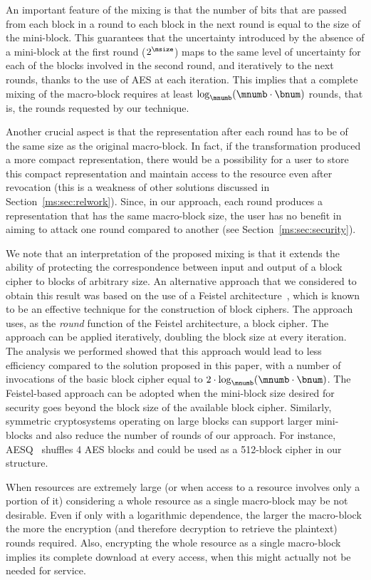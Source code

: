 An important feature of the mixing is that the number of bits that are passed from each block in a round to each block in the next round is equal to the size of the mini-block. This guarantees that the uncertainty introduced by the absence of a mini-block at the first round ($2^{\msize}$) maps to the same level of uncertainty for each of the blocks involved in the second round, and iteratively to the next rounds, thanks to the use of AES at each iteration. This implies that a complete mixing of the macro-block requires at least  $\log_{\mnumb} (\mnumb \cdot \bnum)$ rounds, that is, the rounds requested by  our technique.

Another crucial aspect is that the representation after each round has to be of the same size as the original macro-block. In fact, if the transformation produced a more compact representation, there would be a possibility for a user to store this compact representation and maintain access to the resource even after revocation (this is a weakness of other solutions discussed in Section~\ref{ms:sec:relwork}). Since, in our approach, each round produces a representation that has the same macro-block size, the user has no benefit in aiming to attack one round compared to another (see Section~\ref{ms:sec:security}).

We note that an interpretation of the proposed mixing is that it extends the ability of protecting the correspondence between input and output of a block cipher to blocks of arbitrary size. An alternative approach that we considered to obtain this result was based on the use of a Feistel architecture~\cite{lr88}, which is known to be an effective technique for the construction of block ciphers. The approach uses, as the {\em round} function of the Feistel architecture, a block cipher. The approach can be applied iteratively, doubling the block size at every iteration. The analysis we performed showed that this approach would lead to less efficiency compared to the solution proposed in this paper, with a number of invocations of the basic block cipher equal to $2\cdot \log_{\mnumb} (\mnumb \cdot \bnum)$. The Feistel-based approach can be adopted when the mini-block size desired for security goes beyond the block size of the available block cipher. Similarly, symmetric cryptosystems operating on large blocks can support larger mini-blocks and also reduce the number of rounds of our approach. For instance,  AESQ~\cite{paeq,paeq2} shuffles 4 AES blocks and could be used as a 512-block cipher in our structure.

When resources are extremely large (or when access to a resource involves only a portion of it) considering a whole resource as a single macro-block may be not desirable. Even if only with a logarithmic dependence, the larger the macro-block the more the encryption (and therefore decryption to retrieve the plaintext) rounds required. Also, encrypting the whole resource as a single macro-block implies its complete download at every access, when this might actually not be needed for service.

